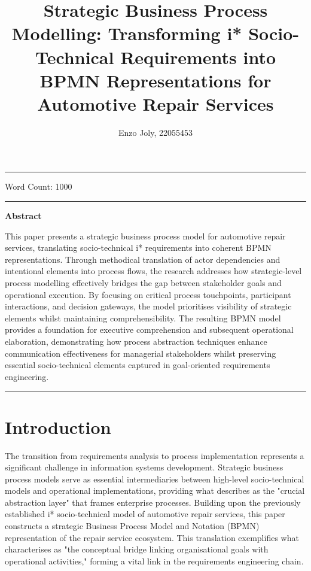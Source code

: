 \documentclass[14pt,a4paper]{article}
\title{Strategic Business Process Modelling: Transforming i* Socio-Technical Requirements into BPMN Representations for Automotive Repair Services}
\author{Enzo Joly, 22055453}
\date{}
\begin{document}
\maketitle

\hrule

\vspace{3em}

Word Count: 1000

\vspace{3em}
\hrule

\vspace{2em}
\textbf{Abstract}
\vspace{1em}

This paper presents a strategic business process model for automotive repair services, translating socio-technical i* requirements into coherent BPMN representations. Through methodical translation of actor dependencies and intentional elements into process flows, the research addresses how strategic-level process modelling effectively bridges the gap between stakeholder goals and operational execution. By focusing on critical process touchpoints, participant interactions, and decision gateways, the model prioritises visibility of strategic elements whilst maintaining comprehensibility. The resulting BPMN model provides a foundation for executive comprehension and subsequent operational elaboration, demonstrating how process abstraction techniques enhance communication effectiveness for managerial stakeholders whilst preserving essential socio-technical elements captured in goal-oriented requirements engineering.

\vspace{3em}
\hrule

\thispagestyle{empty}

\newpage

\tableofcontents
{}

\newpage


\section{Introduction}

The transition from requirements analysis to process implementation represents a significant challenge in information systems development. Strategic business process models serve as essential intermediaries between high-level socio-technical models and operational implementations, providing what \textit{\parencite[p. 76]{Silver2011}} describes as the "crucial abstraction layer" that frames enterprise processes. Building upon the previously established i* socio-technical model of automotive repair services, this paper constructs a strategic Business Process Model and Notation (BPMN) representation of the repair service ecosystem. This translation exemplifies what \textit{\parencite[p. 33]{Poels2018}} characterises as "the conceptual bridge linking organisational goals with operational activities," forming a vital link in the requirements engineering chain.
\end{document}
